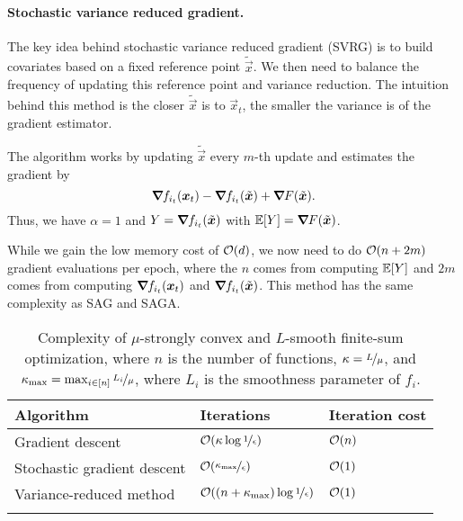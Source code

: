 \paragraph{Stochastic variance reduced gradient.}

The key idea behind stochastic variance reduced gradient (SVRG) is to build covariates based on a
fixed reference point $\tilde{\vec{x}}$. We then need to balance the frequency of updating this
reference point and variance reduction. The intuition behind this method is the closer $\tilde{\vec{x}}$ is to $\vec{x}_t$,
the smaller the variance is of the gradient estimator.

The algorithm works by updating $\tilde{\vec{x}}$ every $m$-th update and estimates the gradient by \[
    \bm{\nabla}_{\! } f_{i_t}(\bm{x}_t) - \bm{\nabla}_{\! } f_{i_t}(\tilde{\bm{x}}) + \bm{\nabla}_{\! } F(\tilde{\bm{x}}).
\]
Thus, we have $\alpha=1$ and $Y=\bm{\nabla}_{\! } f_{i_t}(\tilde{\bm{x}})$ with $\mathbb{E}[Y] =
    \bm{\nabla}_{\! } F(\tilde{\bm{x}})$.

While we gain the low memory cost of $\bigo{d}$, we now need to do $\bigo{n+2m}$ gradient
evaluations per epoch, where the $n$ comes from computing $\mathbb{E}[Y]$ and $2m$ comes from computing
$\bm{\nabla}_{\! } f_{i_t}(\bm{x}_t)$ and $\bm{\nabla}_{\! } f_{i_t}(\tilde{\bm{x}})$. This method has the same
complexity as SAG and SAGA.

\begin{table}[t]
    \centering
    \caption{Complexity of $\mu$-strongly convex and $L$-smooth finite-sum optimization, where $n$ is the number of functions, $\kappa = \nicefrac{L}{\mu}$, and $\kappa_{\max} = \max_{i \in [n]} \nicefrac{L_i}{\mu}$, where $L_i$ is the smoothness parameter of $f_i$.}
    \label{tab:vr}
    \begin{tabular}{lll} \toprule
        \textbf{Algorithm}          & \textbf{Iterations}                                      & \textbf{Iteration cost} \\
        \midrule
        Gradient descent            & $\bigo{\kappa \log \nicefrac{1}{\epsilon}}$              & $\bigo{n}$              \\
        Stochastic gradient descent & $\bigo{\nicefrac{\kappa_{\max}}{\epsilon}}$              & $\bigo{1}$              \\
        Variance-reduced method     & $\bigo{(n + \kappa_{\max}) \log \nicefrac{1}{\epsilon}}$ & $\bigo{1}$              \\
        \bottomrule                                                                                                      \\
    \end{tabular}
\end{table}
